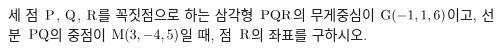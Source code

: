 세 점~$\mathrm{P}$, $\mathrm{Q}$, $\mathrm{R}$를 꼭짓점으로 하는 삼각형~$\mathrm{PQR}$의 무게중심이 $\mathrm{G}(-1{,}\mkern3mu\mathopen{}1{,}\mkern3mu\mathopen{}6)$이고, 선분~$\mathrm{PQ}$의 중점이 $\mathrm{M}(3{,}\mkern3mu\mathopen{}-4{,}\mkern3mu\mathopen{}5)$일 때, 점~$\mathrm{R}$의 좌표를 구하시오.
